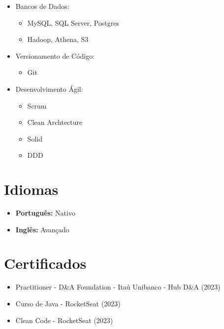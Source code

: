\documentclass[a4paper,10pt]{article}
\begin{document}
\begin{minipage}[t]{0.3\textwidth}
\begin{itemize}[left=0pt, label={}]
        \item Bancos de Dados:
        \begin{itemize}
            \item MySQL, SQL Server, Postgres
            \item Hadoop, Athena, S3
        \end{itemize}
        
        \item Versionamento de Código:
        \begin{itemize}
            \item Git
        \end{itemize}
        
        \item Desenvolvimento Ágil:
        \begin{itemize}
            \item Scrum
            \item Clean Archtecture
            \item Solid
            \item DDD
        \end{itemize}
    \end{itemize}

    \section*{\faLanguage \space Idiomas}
    \begin{itemize}
        \item \textbf{Português:} Nativo
        \item \textbf{Inglês:} Avançado
    \end{itemize}

    \section*{\faCertificate \space Certificados}
    \begin{itemize}[left=0pt]
        \item Practitioner - D\&A Foundation - Itaú Unibanco - Hub D\&A (2023)
        \item Curso de Java - RocketSeat (2023)
        \item Clean Code - RocketSeat (2023)
    \end{itemize}
\end{minipage}
\end{document}
